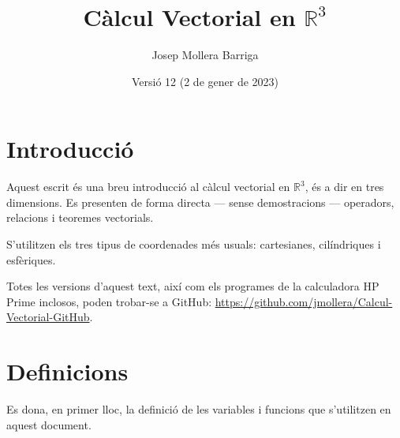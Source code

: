 \documentclass[catalan,a4paper,twoside,11pt]{article}
\begin{document}
\title{Càlcul Vectorial en $\mathbb{R}^3$}
\author{Josep Mollera Barriga}
\date{Versió 12 (2 de gener de 2023)}
\maketitle


\section{Introducció}

Aquest escrit és una breu introducció al càlcul vectorial en $\mathbb{R}^3$, és a dir en tres dimensions. Es presenten de forma directa --- sense demostracions --- operadors, relacions i teoremes vectorials.

S'utilitzen els tres tipus de coordenades més usuals:  cartesianes, 
cilíndriques i esfèriques.

Totes les versions d'aquest text, així com els programes de la calculadora \textsf{HP Prime} inclosos, poden trobar-se a GitHub: \href{https://github.com/jmollera/Calcul-Vectorial-GitHub}{https://github.com/jmollera/Calcul-Vectorial-GitHub}.


\section{Definicions}

Es dona, en primer lloc, la definició de les variables i funcions que s'utilitzen en aquest document.
\end{document}
